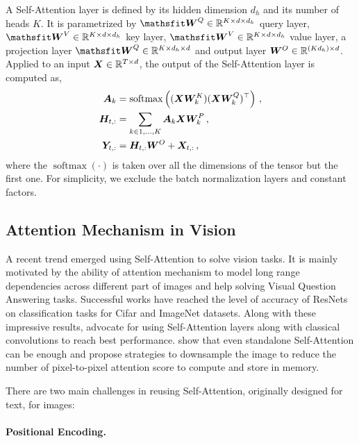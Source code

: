 \documentclass{article} %
\begin{document}
A Self-Attention layer is defined by its hidden dimension $d_{h}$ and its number of heads $K$.  %
It is parametrized by
$\tW^Q \in \R^{K \times d \times d_{h}}$ query layer, $\tW^V \in \R^{K \times d \times d_{h}}$ key layer, $\tW^V \in \R^{K \times d \times d_{h}}$ value layer, a projection layer $\tW^Q \in \R^{K \times d_{h} \times d}$ and output layer ${\bm{W}}^O \in \mathbb{R}^{(Kd_{h})\times d}$. 
%
Applied to an input ${\bm{X}} \in \mathbb{R}^{T\times d}$, the output of the Self-Attention layer is computed as,
%
\begin{align}
  {\bm{A}}_k &= \operatorname{softmax}
  \left(
    ({\bm{X}} {\bm{W}}_k^K)({\bm{X}} {\bm{W}}_k^Q)^\top
  \right)\,, \\
  {\bm{H}}_{t,:} &= 
  \sum_{k \in {1,\dots, K}} 
  {\bm{A}}_k
  {\bm{X}}
  {\bm{W}}_k^P
  \,,\\
  {\bm{Y}}_{t,:} &= {\bm{H}}_{t,:} {\bm{W}}^O + {\bm{X}}_{t,:}\,,
\end{align}
where the $\operatorname{softmax}(\cdot)$ is taken over all the dimensions of the tensor but the first one. For simplicity, we exclude the batch normalization layers and constant factors.%
%


\subsection{Attention Mechanism in Vision}

A recent trend emerged using Self-Attention to solve vision tasks.
%
It is mainly motivated by the ability of attention mechanism to model long range dependencies across different part of images and help solving Visual Question Answering tasks. 
% 
Successful works have reached the level of accuracy of ResNets on classification tasks for Cifar and ImageNet datasets. 
%
Along with these impressive results, \cite{belloAttentionAugmentedConvolutional2019} advocate for using Self-Attention layers along with classical convolutions to reach best performance.
%
\cite{ramachandran2019standaloneselfattention} show that even standalone Self-Attention can be enough and propose strategies to downsample the image to reduce the number of pixel-to-pixel attention score to compute and store in memory.


There are two main challenges in reusing Self-Attention, originally designed for text, for images:
\paragraph{Positional Encoding.}
%
\end{document}
